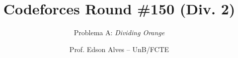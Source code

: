 \title{Codeforces Round \#150 (Div. 2)}
\subtitle{Problema A: \textit{Dividing Orange}}
\author{Prof. Edson Alves -- UnB/FCTE}
\date{}
